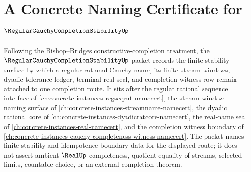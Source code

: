\chapter{A Concrete Naming Certificate for $\RegularCauchyCompletionStabilityUp$}
\label{ch:concrete-instances-regular-cauchy-completion-stability-namecert}

Following the Bishop--Bridges constructive-completion treatment, the $\RegularCauchyCompletionStabilityUp$ packet records the finite stability surface by which a regular rational Cauchy name, its finite stream windows, dyadic tolerance ledger, terminal real seal, and completion-witness row remain attached to one completion route. It sits after the regular rational sequence interface of \autoref{ch:concrete-instances-regseqrat-namecert}, the stream-window naming surface of \autoref{ch:concrete-instances-streamname-namecert}, the dyadic rational core of \autoref{ch:concrete-instances-dyadicratcore-namecert}, the real-name seal of \autoref{ch:concrete-instances-real-namecert}, and the completion witness boundary of \autoref{ch:concrete-instances-cauchy-completeness-witness-namecert}. The packet names finite stability and idempotence-boundary data for the displayed route; it does not assert ambient $\RealUp$ completeness, quotient equality of streams, selected limits, countable choice, or an external completion theorem.

